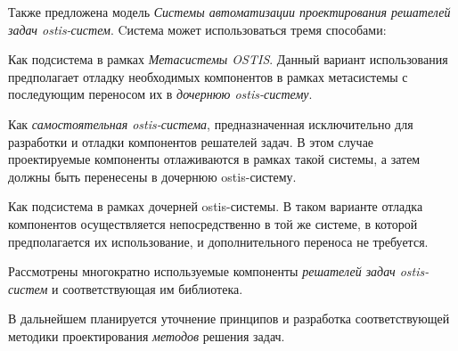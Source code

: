 Также предложена модель \textit{Системы автоматизации проектирования решателей задач ostis-систем}. Cистема может использоваться тремя способами:
\begin{textitemize}
    \item Как подсистема в рамках \textit{Метасистемы OSTIS}. Данный вариант использования предполагает отладку необходимых компонентов в рамках метасистемы с последующим переносом их в \textit{дочернюю ostis-систему}.
    \item Как \textit{самостоятельная ostis-система}, предназначенная исключительно для разработки и отладки компонентов решателей задач. В этом случае проектируемые компоненты отлаживаются в рамках такой системы, а затем должны быть перенесены в дочернюю ostis-систему.
    \item Как подсистема в рамках дочерней ostis-системы. В таком варианте отладка компонентов осуществляется непосредственно в той же системе, в которой предполагается их использование, и дополнительного переноса не требуется.
\end{textitemize}

Рассмотрены многократно используемые компоненты \textit{решателей задач ostis-систем} и соответствующая им библиотека.

В дальнейшем планируется уточнение принципов и разработка соответствующей методики проектирования \textit{методов} решения задач.

%